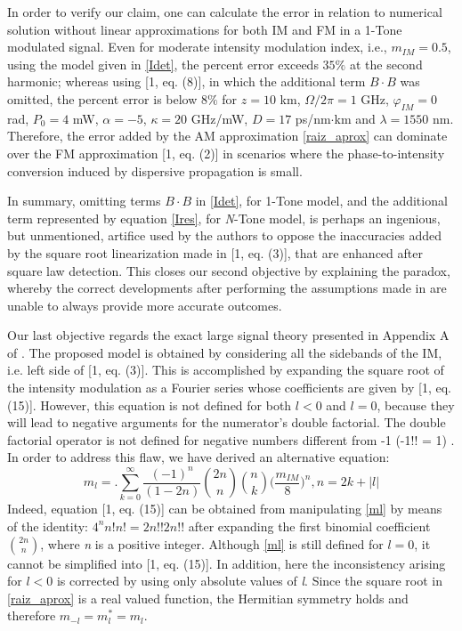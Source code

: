 \documentclass[journal]{IEEEtran}
\begin{document}
In order to verify our claim, one can calculate the error in relation to numerical solution without linear approximations for both IM and FM in a 1-Tone modulated signal. Even for moderate intensity modulation index, i.e., $m_{IM} = 0.5$, using the model given in \eqref{Idet}, the percent error exceeds $35\%$ at the second harmonic; whereas using [1, eq. (8)], in which the additional term $B\cdot B$ was omitted, the percent error is below $8\%$ for $z = 10$ km, $\Omega/2\pi = 1$ GHz, $\varphi_{IM} = 0$ rad, $P_0 = 4$ mW, $\alpha = -5$, $\kappa = 20$ GHz/mW, $D = 17$ ps/nm$\cdot$km and $\lambda = 1550$ nm. Therefore, the error added by the AM approximation \eqref{raiz_aprox} can dominate over the FM approximation [1, eq. (2)] in scenarios where the phase-to-intensity conversion induced by dispersive propagation is small.

In summary, omitting terms $B \cdot B$ in \eqref{Idet}, for 1-Tone model, and the additional term represented by equation \eqref{Ires}, for \emph{N}-Tone model, is perhaps an ingenious, but unmentioned, artifice used by the authors to oppose the inaccuracies added by the square root linearization made in [1, eq. (3)], that are enhanced after square law detection. This closes our second objective by explaining the paradox, whereby the correct developments after performing the assumptions made in \cite{eva} are unable to always provide more accurate outcomes. 

Our last objective regards the exact large signal theory presented in Appendix A of \cite{eva}. The proposed model is obtained by considering all the sidebands of the IM, i.e. left side of [1, eq. (3)]. This is accomplished by expanding the square root of the intensity modulation as a Fourier series whose coefficients are given by [1, eq. (15)]. However, this equation is not defined for both $l < 0$ and $l = 0$, because they will lead to negative arguments for the numerator's double factorial. The double factorial operator is not defined for negative numbers different from -1 (-1!! = 1) \cite{Arfken}.  In order to address this flaw, we have derived an alternative equation:
\begin{equation} \label{ml}
m_l = \bigg.\sum_{k = 0}^{\infty}\frac{(-1)^n}{(1 - 2n)}\binom{2n}{n}\binom{n}{k}\bigg(\frac{m_{IM}}{8}\bigg)^n, n = 2k + |l|
\end{equation}
Indeed, equation [1, eq. (15)] can be obtained from manipulating \eqref{ml} by means of the identity: $4^nn!n! = 2n!!2n!!$ after expanding the first binomial coefficient $\binom{2n}{n}$, where \emph{n} is a positive integer. Although \eqref{ml} is still defined for $l = 0$, it cannot be simplified into [1, eq. (15)]. In addition, here the inconsistency arising for $l < 0$ is corrected by using only absolute values of \emph{l}. Since the square root in \eqref{raiz_aprox} is a real valued function, the Hermitian symmetry holds and therefore $m_{-l} = m_l^* = m_l$. 
\end{document}
